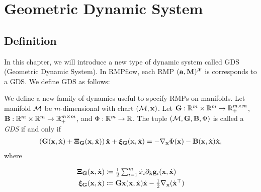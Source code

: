 \chapter{Geometric Dynamic System}
\section{Definition}
In this chapter, we will introduce a new type of dynamic system called GDS (Geometric Dynamic System). In RMPflow, each RMP $(\mathbf{a}, \mathbf{M})^{\mathcal{X}}$ is corresponds to a GDS. We define GDS as follows:

We define a new family of dynamics useful to specify RMPs on manifolds. 
Let manifold $\mathcal{M}$ be $m$-dimensional with chart $(\mathcal{M}, \mathbf{x})$. Let $\mathbf{G}: \mathbb{R}^m \times \mathbb{R}^m \to \mathbb{R}^{m\times m}_{+}$, $\mathbf{B}: \mathbb{R}^m \times \mathbb{R}^m \to \mathbb{R}^{m\times m}_{+}$, and $\Phi: \mathbb{R}^m \to \mathbb{R}$.
The tuple $(\mathcal{M}, \mathbf{G}, \mathbf{B}, \Phi)$ is called a \emph{GDS} if and only if
\begin{align} \label{eq:GDS}
\left(\mathbf{G}(\mathbf{x},{\dot{\mathbf{x}}}) + \bm\Xi_{\mathbf{G}}(\mathbf{x},{\dot{\mathbf{x}}})\right) {\ddot{\mathbf{x}}} 
+ \bm\xi_{\mathbf{G}}(\mathbf{x},{\dot{\mathbf{x}}})  = - \nabla_{\mathbf{x}} \Phi(\mathbf{x}) - \mathbf{B}(\mathbf{x},{\dot{\mathbf{x}}}){\dot{\mathbf{x}}},
\end{align}
where

\fi 


\begin{align}
\bm\Xi_{\mathbf{G}}(\mathbf{x},{\dot{\mathbf{x}}}) &\coloneqq \textstyle \frac{1}{2} \sum_{i=1}^m  \dot{x}_i \partial_{{\dot{\mathbf{x}}}} \mathbf{g}_{i}(\mathbf{x},{\dot{\mathbf{x}}})  \label{eq:Xi} \\
\bm\xi_{\mathbf{G}}(\mathbf{x},{\dot{\mathbf{x}}}) &\coloneqq \textstyle {\mathbf{G}}{\mathbf{x}}(\mathbf{x},{\dot{\mathbf{x}}}) {\dot{\mathbf{x}}} - \frac{1}{2} \nabla_{\mathbf{x}} ({\dot{\mathbf{x}}}^\top )
\end{align}

